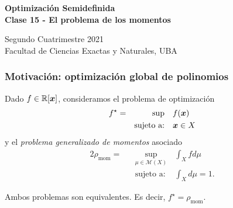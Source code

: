 \documentclass[aspectratio=169,12pt,spanish]{beamer}
\begin{document}

\begin{frame}

 \begin{center}

\Large\textbf{Optimización Semidefinida} \\
\large\textbf{Clase 15 - El problema de los momentos}




\vspace{1cm}
 Segundo Cuatrimestre 2021
 \\
 {\small Facultad de Ciencias Exactas y Naturales, UBA}
 \end{center}

\end{frame}



\begin{frame}

\frametitle{Motivación: optimización global de polinomios}

Dado $f \in \mathbb{R}[\bm{x}]$, consideramos el problema de optimización
\begin{alignat*}{2}
  f^{\star} = & & \sup \quad & f(\bm{x})    \\
   & & \text{sujeto a:} \quad & \bm{x} \in X
\end{alignat*}
y el \emph{problema generalizado de momentos} asociado
\begin{alignat*}{2}
  \rho_{\text{mom}} = & & \sup_{\mu \in \mathcal{M}(X)} & \int_X f d\mu   \\
   & & \text{sujeto a: } & \int_X d\mu = 1.
\end{alignat*}

Ambos problemas son equivalentes. Es decir, $f^{\star} = \rho_{\text{mom}}$.


\end{frame}

\end{document}
